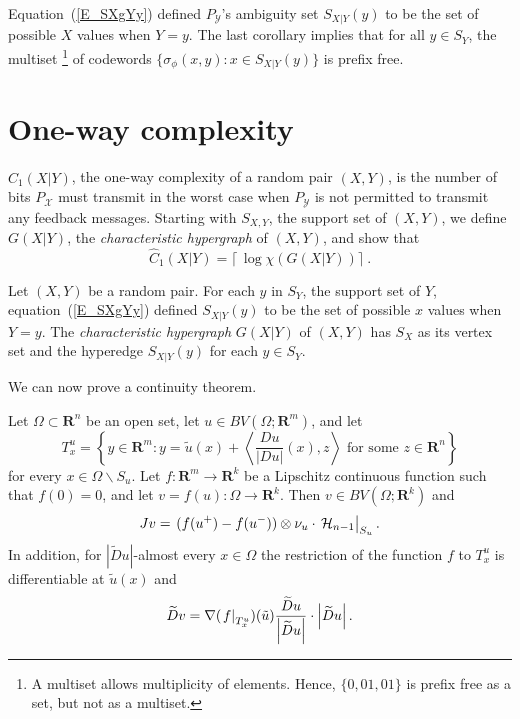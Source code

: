 \documentclass[manuscript, printscheme]{aomart}
\newtheorem[{}\it]{thm}{Theorem}[section]
\theoremstyle{definition}
\newtheorem*[{}\it]{notation}{Notation}
\newcommand{\st}{\sigma}
\newcommand{\XcY}{{(X,Y)}}
\newcommand{\SX}{{S_X}}
\newcommand{\SY}{{S_Y}}
\newcommand{\SXY}{{S_{X,Y}}}
\newcommand{\SXgYy}{{S_{X|Y}(y)}}
\newcommand{\Cw}[1]{{\hat C_#1(X|Y)}}
\newcommand{\G}{{G(X|Y)}}
\newcommand{\PY}{{P_{\mathcal{Y}}}}
\newcommand{\X}{\mathcal{X}}
\newcommand{\wt}{\widetilde}
\newcommand{\eval}[2][\right]{\relax
  \ifx#1\right\relax \left.\fi#2#1\rvert}
\newcommand{\envert}[1]{\left\lvert#1\right\rvert}
\let\abs=\envert
\begin{document}
Equation~(\ref{E_SXgYy}) defined $\PY$'s ambiguity set $\SXgYy$
to be the set of possible $X$ values when $Y=y$.
The last corollary implies that for all $y\in\SY$,
the multiset%
\footnote{A multiset allows multiplicity of elements.
Hence, $\{0,01,01\}$ is prefix free as a set, but not as a multiset.}
of codewords $\{\st_\phi(x,y):x\in\SXgYy\}$ is prefix free.

\section{One-way complexity}
\label{S_Cp1}

$\Cw1$, the one-way complexity of a random pair $\XcY$,
is the number of bits $P_\X$ must transmit in the worst case
when $\PY$ is not permitted to transmit any feedback messages.
Starting with $\SXY$, the support set of $\XcY$, we define $\G$,
the \textit{characteristic hypergraph} of $\XcY$, and show that
\[
\Cw1=\lceil\,\log\chi(\G)\rceil\ .
\]

Let $\XcY$ be a random pair. For each $y$ in $\SY$, the support set of
$Y$, equation~(\ref{E_SXgYy}) defined $\SXgYy$ to be the set of possible
$x$ values when $Y=y$. The \textit{characteristic hypergraph} $\G$ of
$\XcY$ has $\SX$ as its vertex set and the hyperedge $\SXgYy$ for each
$y\in\SY$.


We can now prove a continuity theorem.
\begin{thm}\label{t:conl}
Let $\Omega \subset\mathbf{R}^n$ be an open set, let
$u\in BV(\Omega ;\mathbf{R}^m)$, and let
\begin{equation}\label{quts}
T^u_x=\left\{y\in\mathbf{R}^m:
 y=\tilde u(x)+\left\langle \frac{Du}{\abs{Du}}(x),z
\right\rangle \text{ for some }z\in\mathbf{R}^n\right\}
\end{equation}
for every $x\in\Omega \backslash S_u$. Let $f\colon \mathbf{R}^m\to
\mathbf{R}^k$ be a Lipschitz continuous function such that $f(0)=0$, and
let $v=f(u)\colon \Omega \to \mathbf{R}^k$. Then $v\in BV(\Omega
;\mathbf{R}^k)$ and
\begin{equation}
Jv=\eval{(f(u^+)-f(u^-))\otimes \nu_u\cdot\,
\mathcal{H}_{n-1}}_{S_u}.
\end{equation}
In addition, for $\abs{\wt{D}u}$-almost every $x\in\Omega $ the
restriction of the function $f$ to $T^u_x$ is differentiable at $\tilde
u(x)$ and
\begin{equation}
\wt{D}v=\nabla (\eval{f}_{T^u_x})(\tilde u)
\frac{\wt{D}u}{\abs{\wt{D}u}}\cdot\abs{\wt{D}u}.\end{equation}
\end{thm}
\end{document}
